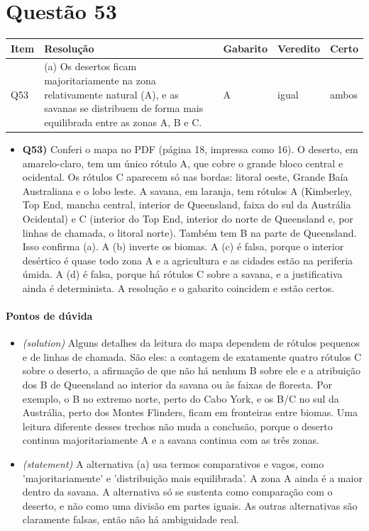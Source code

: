 \documentclass{article}%
\begin{document}
\section*{Questão 53}%
\begin{longtable}{@{}p{} p{} p{} p{} p{}@{}}\toprule Item & Resolução & Gabarito & Veredito & Certo \\ \midrule
Q53 & (a) Os desertos ficam majoritariamente na zona relativamente natural (A), e as savanas se distribuem de forma mais equilibrada entre as zonas A, B e C. & A & igual & ambos \\
\bottomrule\end{longtable}%
\begin{itemize}%
\item%
\textbf{Q53)} Conferi o mapa no PDF (página 18, impressa como 16). O deserto, em amarelo{-}claro, tem um único rótulo A, que cobre o grande bloco central e ocidental. Os rótulos C aparecem só nas bordas: litoral oeste, Grande Baía Australiana e o lobo leste. A savana, em laranja, tem rótulos A (Kimberley, Top End, mancha central, interior de Queensland, faixa do sul da Austrália Ocidental) e C (interior do Top End, interior do norte de Queensland e, por linhas de chamada, o litoral norte). Também tem B na parte de Queensland. Isso confirma (a). A (b) inverte os biomas. A (c) é falsa, porque o interior desértico é quase todo zona A e a agricultura e as cidades estão na periferia úmida. A (d) é falsa, porque há rótulos C sobre a savana, e a justificativa ainda é determinista. A resolução e o gabarito coincidem e estão certos.%
\end{itemize}%
\paragraph{Pontos de dúvida}%
\begin{itemize}%
\item%
\textit{(solution)} Alguns detalhes da leitura do mapa dependem de rótulos pequenos e de linhas de chamada. São eles: a contagem de exatamente quatro rótulos C sobre o deserto, a afirmação de que não há nenhum B sobre ele e a atribuição dos B de Queensland ao interior da savana ou às faixas de floresta. Por exemplo, o B no extremo norte, perto do Cabo York, e os B/C no sul da Austrália, perto dos Montes Flinders, ficam em fronteiras entre biomas. Uma leitura diferente desses trechos não muda a conclusão, porque o deserto continua majoritariamente A e a savana continua com as três zonas.%
\item%
\textit{(statement)} A alternativa (a) usa termos comparativos e vagos, como 'majoritariamente' e 'distribuição mais equilibrada'. A zona A ainda é a maior dentro da savana. A alternativa só se sustenta como comparação com o deserto, e não como uma divisão em partes iguais. As outras alternativas são claramente falsas, então não há ambiguidade real.%
\end{itemize}%
\end{document}
